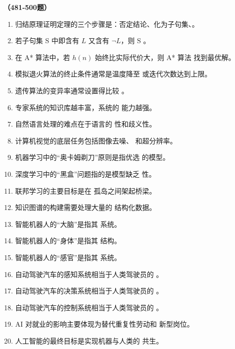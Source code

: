 \vspace{1em}
\textbf{（481-500题）}
\begin{enumerate}[resume,leftmargin=2em,itemsep=1pt]
\item 归结原理证明定理的三个步骤是：否定结论、化为子句集、\underline{\hspace{3em}}。
\item 若子句集 S 中即含有 $L$ 又含有 $\neg L$，则 S \underline{\hspace{3em}}。
\item 在 A* 算法中，若 $h(n)$ 始终比实际代价大，则 A* 算法 \underline{\hspace{3em}} 找到最优解。
\item 模拟退火算法的终止条件通常是温度降至 \underline{\hspace{3em}} 或迭代次数达到上限。
\item 遗传算法的变异率通常设置得比较 \underline{\hspace{3em}}。
\item 专家系统的知识库越丰富，系统的 \underline{\hspace{3em}} 能力越强。
\item 自然语言处理的难点在于语言的 \underline{\hspace{3em}} 性和歧义性。
\item 计算机视觉的底层任务包括图像去噪、\underline{\hspace{3em}} 和超分辨率。
\item 机器学习中的“奥卡姆剃刀”原则是指优选 \underline{\hspace{3em}} 的模型。
\item 深度学习中的“黑盒”问题指的是模型缺乏 \underline{\hspace{3em}} 性。
\item 联邦学习的主要目标是在 \underline{\hspace{3em}} 孤岛之间架起桥梁。
\item 知识图谱的构建需要处理大量的 \underline{\hspace{3em}} 结构化数据。
\item 智能机器人的“大脑”是指其 \underline{\hspace{3em}} 系统。
\item 智能机器人的“身体”是指其 \underline{\hspace{3em}} 结构。
\item 智能机器人的“感官”是指其 \underline{\hspace{3em}} 系统。
\item 自动驾驶汽车的感知系统相当于人类驾驶员的 \underline{\hspace{3em}}。
\item 自动驾驶汽车的决策系统相当于人类驾驶员的 \underline{\hspace{3em}}。
\item 自动驾驶汽车的控制系统相当于人类驾驶员的 \underline{\hspace{3em}}。
\item AI 对就业的影响主要体现为替代重复性劳动和 \underline{\hspace{3em}} 新型岗位。
\item 人工智能的最终目标是实现机器与人类的 \underline{\hspace{3em}} 共生。
\end{enumerate}

